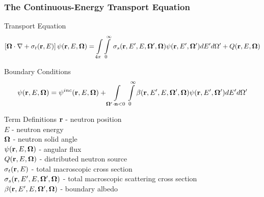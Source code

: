 \documentclass[compress,10pt]{beamer}
\renewcommand{\vec}[1]{\mathbf{#1}}
\begin{document}
\typeout{***********************************************************************************}
\begin{frame}[t]\frametitle{The Continuous-Energy Transport Equation} \vspace{-2.5mm}
\begin{block}{Transport Equation}{\footnotesize
\begin{equation*}
\left[ { \bf \Omega} \cdot {\bf \nabla}  + \sigma_t ({\bf r}, E) \right] \psi ({\bf r}, E, {\bf \Omega}) = \int\displaylimits_{4 \pi} \int\displaylimits_{0}^{\infty}  \, \sigma_s ({\bf r}, E' , E, {\bf \Omega}' , {\bf \Omega}) \psi ({\bf r}, E', {\bf \Omega}') d E'  d \Omega'+ Q ({\bf r}, E, {\bf \Omega})
\end{equation*}
}\end{block} \vspace{-1.0mm}
\begin{block}{Boundary Conditions}{\footnotesize
\begin{equation*}
\psi ({\bf r}, E, {\bf \Omega}) = \psi^{inc} ({\bf r}, E, {\bf \Omega}) +  \int\displaylimits_{\vec{\Omega}' \cdot \vec{n} < 0} \int\displaylimits_{0}^{\infty} \beta ({\bf r}, E' , E, {\bf \Omega}' , {\bf \Omega}) \psi ({\bf r}, E', {\bf \Omega}') d E'  d \Omega'
\end{equation*}
}\end{block} \vspace{-1.0mm}
\begin{block}{Term Definitions} {\footnotesize
${\bf r}$ -  neutron position \\
$E$ -  neutron energy \\
${\bf \Omega}$ - neutron solid angle \\
$\psi  ({\bf r}, E, {\bf \Omega})$ - angular flux  \\
$Q  ({\bf r}, E, {\bf \Omega})$ - distributed neutron source \\
$\sigma_t ({\bf r}, E)$ - total macroscopic cross section \\
$\sigma_s ({\bf r}, E' , E, {\bf \Omega}' , {\bf \Omega})$ - total macroscopic scattering cross section\\
$\beta ({\bf r}, E' , E, {\bf \Omega}' , {\bf \Omega})$ - boundary albedo 
}\end{block}
\end{frame}
\end{document}
